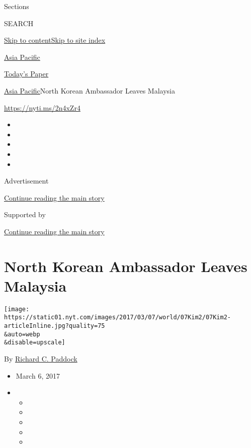 Sections

SEARCH

\protect\hyperlink{site-content}{Skip to
content}\protect\hyperlink{site-index}{Skip to site index}

\href{https://www.nytimes.com/section/world/asia}{Asia Pacific}

\href{https://myaccount.nytimes.com/auth/login?response_type=cookie\&client_id=vi}{}

\href{https://www.nytimes.com/section/todayspaper}{Today's Paper}

\href{/section/world/asia}{Asia Pacific}\textbar{}North Korean
Ambassador Leaves Malaysia

\url{https://nyti.ms/2n4xZr4}

\begin{itemize}
\item
\item
\item
\item
\item
\end{itemize}

Advertisement

\protect\hyperlink{after-top}{Continue reading the main story}

Supported by

\protect\hyperlink{after-sponsor}{Continue reading the main story}

\hypertarget{north-korean-ambassador-leaves-malaysia}{%
\section{North Korean Ambassador Leaves
Malaysia}\label{north-korean-ambassador-leaves-malaysia}}

\texttt{[image: https://static01.nyt.com/images/2017/03/07/world/07Kim2/07Kim2-articleInline.jpg?quality=75\\\&auto=webp\\\&disable=upscale]}

By \href{https://www.nytimes.com/by/richard-c-paddock}{Richard C.
Paddock}

\begin{itemize}
\item
  March 6, 2017
\item
  \begin{itemize}
  \item
  \item
  \item
  \item
  \item
  \end{itemize}
\end{itemize}

